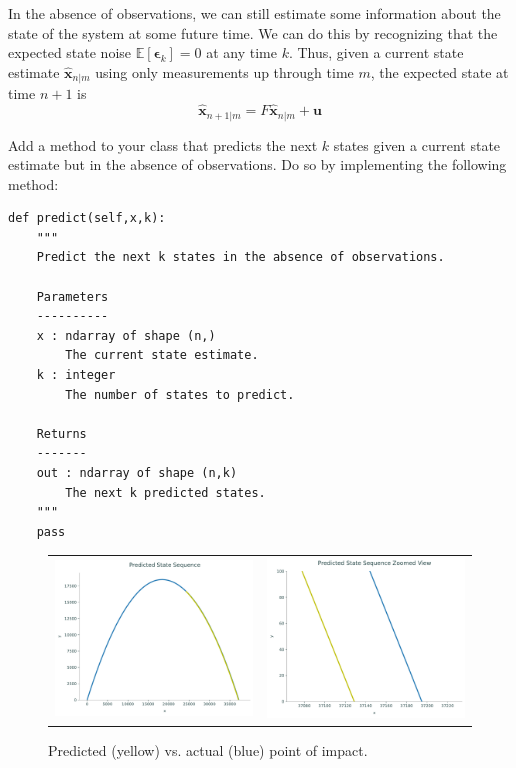 In the absence of observations, we can still estimate some information about the state of the system at some future time.
We can do this by recognizing that the expected state noise $\mathbb{E}\left[\boldsymbol{\epsilon}_{k}\right] = 0$ at any time $k$.
Thus, given a current state estimate $\widehat{\mathbf{x}}_{n|m}$ using only measurements up through time $m$, the expected state at time $n+1$ is
\begin{equation*}
\widehat{\mathbf{x}}_{n+1|m} = F \widehat{\mathbf{x}}_{n|m} + \mathbf{u}
\end{equation*}

\begin{problem}
Add a method to your class that predicts the next $k$ states given a current state estimate but in the absence of observations.
Do so by implementing the following method:
\begin{lstlisting}
def predict(self,x,k):
    """
    Predict the next k states in the absence of observations.

    Parameters
    ----------
    x : ndarray of shape (n,)
        The current state estimate.
    k : integer
        The number of states to predict.

    Returns
    -------
    out : ndarray of shape (n,k)
        The next k predicted states.
    """
    pass
\end{lstlisting}
\end{problem}

\begin{figure}
    \centering
    \begin{tabular}{cc}
    \includegraphics[width=.45\textwidth]{figures/impact_macro} &
    \includegraphics[width=.45\textwidth]{figures/impact_micro}
    \end{tabular}
    \caption{Predicted (yellow) vs. actual (blue) point of impact.}
    \label{fig:impact}
\end{figure}

